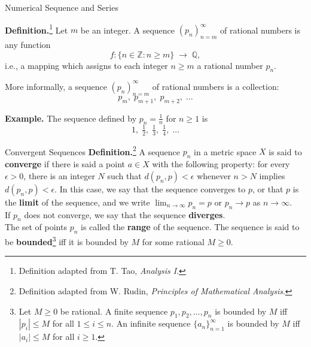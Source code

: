 \documentclass{beamer}
\begin{document}
\begin{frame}{Numerical Sequence and Series}

\textbf{Definition.}\footnote{Definition adapted from T. Tao, \emph{Analysis
I}.} Let $m$ be an integer.  
A sequence $(p_n)_{n=m}^{\infty}$ of rational numbers is any function
\[
f: \{ n \in \mathbb{Z} : n \geq m \} \;\to\; \mathbb{Q},
\]
i.e., a mapping which assigns to each integer $n \geq m$ a rational number
$p_n$.

\medskip
More informally, a sequence $(p_n)_{n=m}^{\infty}$ of rational numbers is a
collection:
\[
p_m, \; p_{m+1}, \; p_{m+2}, \; \dots
\]

\bigskip
\textbf{Example.}  
The sequence defined by $p_n = \tfrac{1}{n}$ for $n \geq 1$ is
\[
1, \; \tfrac{1}{2}, \; \tfrac{1}{3}, \; \tfrac{1}{4}, \; \dots
\]

    
\end{frame}

\begin{frame}{Convergent Sequences}
\textbf{Definition.}\footnote{Definition adapted from W. Rudin, \emph{Principles
of Mathematical Analysis}.} A sequence ${p_n}$ in a metric space $X$ is said to
\textbf{converge} if there is said a point $a \in X$ with the following
property: for every $\epsilon > 0$, there is an integer $N$ such that $d(p_n, p)
< \epsilon$ whenever $n > N$ implies $d(p_n,p)< \epsilon$.  In this case, we say
that the sequence converges to $p$, or that $p$ is the \textbf{limit} of the
sequence, and we write $\lim_{n \to \infty} p_n = p$ or $p_n \to p$ as $n \to
\infty$.\\ 
If ${p_n}$ does not converge, we say that the sequence \textbf{diverges}.\\ 

The set of points $p_n$ is called the \textbf{range} of the sequence. The
sequence is said to be \textbf{bounded}\footnote{Let $M \geq 0$ be rational.  A
finite sequence $p_1, p_2, \dotsc, p_n$ is bounded by $M$ iff $|p_i| \leq M$ for
all $1 \leq i \leq n$. An infinite sequence $\{a_n\}_{n=1}^{\infty}$ is bounded
by $M$ iff $|a_i| \leq M$ for all $i \geq 1$. } iff it is bounded by $M$ for
some rational $M \geq 0$. 
\end{frame}
\end{document}
